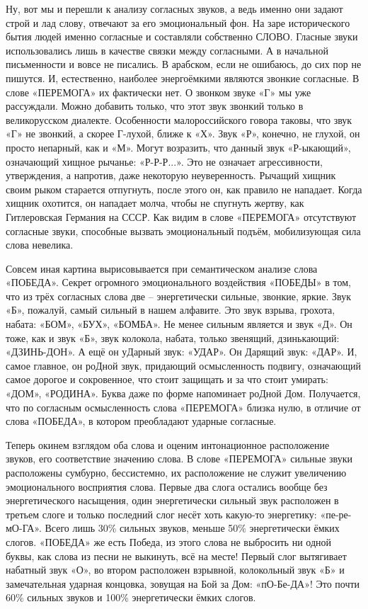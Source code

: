 Ну, вот мы и перешли к анализу согласных звуков, а ведь именно они задают строй
и лад слову, отвечают за его эмоциональный фон. На заре исторического бытия
людей именно согласные и составляли собственно СЛОВО. Гласные звуки
использовались лишь в качестве связки между согласными. А в начальной
письменности и вовсе не писались. В арабском, если не ошибаюсь, до сих пор не
пишутся. И, естественно, наиболее энергоёмкими являются звонкие согласные. В
слове «ПЕРЕМОГА» их фактически нет. О звонком звуке «Г» мы уже рассуждали.
Можно добавить только, что этот звук звонкий только в великорусском диалекте.
Особенности малороссийского говора таковы, что звук «Г» не звонкий, а скорее
Г-лухой, ближе к «Х». Звук «Р», конечно, не глухой, он просто непарный, как и
«М». Могут возразить, что данный звук «Р-ыкающий», означающий хищное рычанье:
«Р-Р-Р...». Это не означает агрессивности, утверждения, а напротив, даже
некоторую неуверенность. Рычащий хищник своим рыком старается отпугнуть, после
этого он, как правило не нападает. Когда хищник охотится, он нападает молча,
чтобы не спугнуть жертву, как Гитлеровская Германия на СССР. Как видим в слове
«ПЕРЕМОГА» отсутствуют согласные звуки, способные вызвать эмоциональный подъём,
мобилизующая сила слова невелика.

Совсем иная картина вырисовывается при семантическом анализе слова «ПОБЕДА».
Секрет огромного эмоционального воздействия «ПОБЕДЫ» в том, что из трёх
согласных слова две – энергетически сильные, звонкие, яркие. Звук «Б», пожалуй,
самый сильный в нашем алфавите. Это звук взрыва, грохота, набата: «БОМ», «БУХ»,
«БОМБА». Не менее сильным является и звук «Д». Он тоже, как и звук «Б», звук
колокола, набата, только звенящий, дзинькающий: «ДЗИНЬ-ДОН». А ещё он уДарный
звук: «УДАР». Он Дарящий звук: «ДАР». И, самое главное, он роДной звук,
придающий осмысленность подвигу, означающий самое дорогое и сокровенное, что
стоит защищать и за что стоит умирать: «ДОМ», «РОДИНА». Буква даже по форме
напоминает роДной Дом. Получается, что по согласным осмысленность слова
«ПЕРЕМОГА» близка нулю, в отличие от слова «ПОБЕДА», в котором преобладают
ударные согласные.

Теперь окинем взглядом оба слова и оценим интонационное расположение звуков,
его соответствие значению слова. В слове «ПЕРЕМОГА» сильные звуки расположены
сумбурно, бессистемно, их расположение не служит увеличению эмоционального
восприятия слова. Первые два слога остались вообще без энергетического
насыщения, один энергетически сильный звук расположен в третьем слоге и только
последний слог несёт хоть какую-то энергетику: «пе-ре-мО-ГА». Всего лишь 30\%
сильных звуков, меньше 50\% энергетически ёмких слогов. «ПОБЕДА» же есть Победа,
из этого слова не выбросить ни одной буквы, как слова из песни не выкинуть, всё
на месте! Первый слог вытягивает набатный звук «О», во втором расположен
взрывной, колокольный звук «Б» и замечательная ударная концовка, зовущая на Бой
за Дом: «пО-Бе-ДА»! Это почти 60\% сильных звуков и 100\% энергетически ёмких
слогов.

